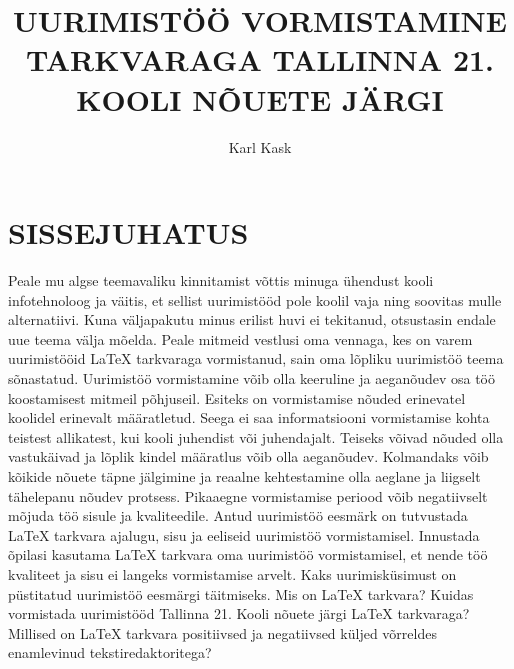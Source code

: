 \documentclass{21kuur}
\title{UURIMISTÖÖ VORMISTAMINE \latex TARKVARAGA TALLINNA 21. KOOLI NÕUETE JÄRGI}
\author{Karl Kask}
\begin{document}
\maketitle
\tableofcontents

\newpage
\chapter*{SISSEJUHATUS}
Peale mu algse teemavaliku kinnitamist võttis minuga ühendust kooli infotehnoloog ja väitis, et sellist uurimistööd pole koolil vaja ning soovitas mulle alternatiivi. Kuna väljapakutu minus erilist huvi ei tekitanud, otsustasin endale uue teema välja mõelda. Peale mitmeid vestlusi oma vennaga, kes on varem uurimistööid LaTeX tarkvaraga vormistanud, sain oma lõpliku uurimistöö teema sõnastatud.
Uurimistöö vormistamine võib olla keeruline ja aeganõudev osa töö koostamisest mitmeil põhjuseil. Esiteks on vormistamise nõuded erinevatel koolidel erinevalt määratletud. Seega ei saa informatsiooni vormistamise kohta teistest allikatest, kui kooli juhendist või juhendajalt. Teiseks võivad nõuded olla vastukäivad ja lõplik kindel määratlus võib olla aeganõudev. Kolmandaks võib kõikide nõuete täpne jälgimine ja reaalne kehtestamine olla aeglane ja liigselt tähelepanu nõudev protsess. Pikaaegne vormistamise periood võib negatiivselt mõjuda töö sisule ja kvaliteedile.
Antud uurimistöö eesmärk on tutvustada LaTeX tarkvara ajalugu, sisu ja eeliseid uurimistöö vormistamisel. Innustada õpilasi kasutama LaTeX tarkvara oma uurimistöö vormistamisel, et nende töö kvaliteet ja sisu ei langeks vormistamise arvelt. 
Kaks uurimisküsimust on püstitatud uurimistöö eesmärgi täitmiseks. Mis on LaTeX tarkvara? Kuidas vormistada uurimistööd Tallinna 21. Kooli nõuete järgi LaTeX tarkvaraga? Millised on LaTeX tarkvara positiivsed ja negatiivsed küljed võrreldes enamlevinud tekstiredaktoritega?
\newpage
\end{document}
